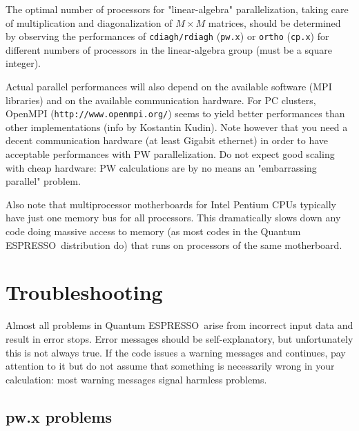 \documentclass[12pt,a4paper]{article}
\def\qe{{\sc Quantum ESPRESSO}}
\def\pwx{\texttt{pw.x}}
\def\cpx{\texttt{cp.x}}
\begin{document}
The optimal number of processors for "linear-algebra"
parallelization, taking care of multiplication and diagonalization 
of $M\times M$ matrices, should be determined by observing the
performances of \texttt{cdiagh/rdiagh} (\pwx) or \texttt{ortho} (\cpx)
for different numbers of processors in the linear-algebra group
(must be a square integer).

Actual parallel performances will also depend on the available software 
(MPI libraries) and on the available communication hardware. For
PC clusters, OpenMPI (\texttt{http://www.openmpi.org/}) seems to yield better 
performances than other implementations (info by Kostantin Kudin). 
Note however that you need a decent communication hardware (at least 
Gigabit ethernet) in order to have acceptable performances with 
PW parallelization. Do not expect good scaling with cheap hardware: 
PW calculations are by no means an "embarrassing parallel" problem.
   
Also note that multiprocessor motherboards for Intel Pentium CPUs typically 
have just one memory bus for all processors. This dramatically
slows down any code doing massive access to memory (as most codes 
in the \qe\ distribution do) that runs on processors of the same
motherboard.

\section{Troubleshooting}

Almost all problems in \qe\ arise from incorrect input data 
and result in
error stops. Error messages should be self-explanatory, but unfortunately
this is not always true. If the code issues a warning messages and continues,
pay attention to it but do not assume that something is necessarily wrong in
your calculation: most warning messages signal harmless problems.

\subsection{pw.x problems}
\end{document}
